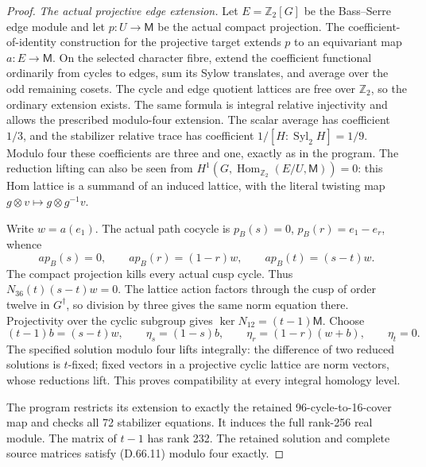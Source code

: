 \begin{proof}
\emph{The actual projective edge extension.}
Let \(E=\mathbb Z_2[G]\) be the Bass--Serre edge module and
let \(p:U\to\mathsf M\) be the actual compact projection.
The coefficient-of-identity construction for the projective
target extends \(p\) to an equivariant map
\(a:E\to\mathsf M\). On the selected character fibre,
extend the coefficient functional ordinarily from cycles
to edges, sum its Sylow translates, and average over the
odd remaining cosets. The cycle and edge quotient lattices
are free over \(\mathbb Z_2\), so the ordinary extension
exists. The same formula is integral relative injectivity
and allows the prescribed modulo-four extension. The
scalar average has coefficient \(1/3\), and the
stabilizer relative trace has coefficient
\(1/[H:\operatorname{Syl}_2H]=1/9\).
Modulo four these coefficients are three and one,
exactly as in the program. The
reduction lifting can also be seen from
\(H^1(G,\operatorname{Hom}_{\mathbb Z_2}(E/U,\mathsf M))=0\):
this Hom lattice is a summand of an induced lattice, with
the literal twisting map \(g\otimes v\mapsto g\otimes g^{-1}v\).

Write \(w=a(e_1)\). The actual path cocycle is
\(p_B(s)=0\), \(p_B(r)=e_1-e_r\), whence
\[
 a p_B(s)=0,\qquad a p_B(r)=(1-r)w,\qquad
 a p_B(t)=(s-t)w.
 \tag{D.66.10}
\]
The compact projection kills every actual cusp cycle.
Thus \(N_{36}(t)(s-t)w=0\). The lattice action factors
through the cusp of order twelve in \(G^\dagger\), so
division by three gives the same norm equation there.
Projectivity over the cyclic subgroup gives
\(\ker N_{12}=(t-1)\mathsf M\). Choose
\[
 (t-1)b=(s-t)w,\qquad
 \eta_s=(1-s)b,\qquad
 \eta_r=(1-r)(w+b),\qquad\eta_t=0.
 \tag{D.66.11}
\]
The specified solution modulo four lifts integrally:
the difference of two reduced solutions is \(t\)-fixed;
fixed vectors in a projective cyclic lattice are norm
vectors, whose reductions lift. This proves compatibility
at every integral homology level.

The program 
restricts its extension to exactly the retained
96-cycle-to-16-cover map and checks all 72 stabilizer
equations. It induces the full rank-256 real module.
The matrix of \(t-1\) has rank 232. The retained solution
and complete source matrices satisfy (D.66.11) modulo
four exactly.


\end{proof}
